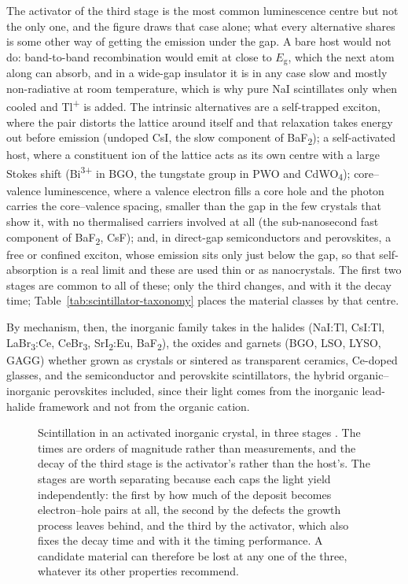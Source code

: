 The activator of the third stage is the most common luminescence centre but not the only one, and the figure draws that case alone; what every alternative shares is some other way of getting the emission under the gap.
A bare host would not do: band-to-band recombination would emit at close to $E_\mathrm{g}$, which the next atom along can absorb, and in a wide-gap insulator it is in any case slow and mostly non-radiative at room temperature, which is why pure NaI scintillates only when cooled and Tl\textsuperscript{+} is added.
The intrinsic alternatives are a self-trapped exciton, where the pair distorts the lattice around itself and that relaxation takes energy out before emission (undoped CsI, the slow component of BaF\textsubscript{2}); a self-activated host, where a constituent ion of the lattice acts as its own centre with a large Stokes shift (Bi\textsuperscript{3+} in BGO, the tungstate group in PWO and CdWO\textsubscript{4}); core--valence luminescence, where a valence electron fills a core hole and the photon carries the core--valence spacing, smaller than the gap in the few crystals that show it, with no thermalised carriers involved at all (the sub-nanosecond fast component of BaF\textsubscript{2}, CsF); and, in direct-gap semiconductors and perovskites, a free or confined exciton, whose emission sits only just below the gap, so that self-absorption is a real limit and these are used thin or as nanocrystals.
The first two stages are common to all of these; only the third changes, and with it the decay time; Table~\ref{tab:scintillator-taxonomy} places the material classes by that centre.

By mechanism, then, the inorganic family takes in the halides (NaI:Tl, CsI:Tl, LaBr\textsubscript{3}:Ce, CeBr\textsubscript{3}, SrI\textsubscript{2}:Eu, BaF\textsubscript{2}), the oxides and garnets (BGO, LSO, LYSO, GAGG) whether grown as crystals or sintered as transparent ceramics, Ce-doped glasses, and the semiconductor and perovskite scintillators, the hybrid organic--inorganic perovskites included, since their light comes from the inorganic lead-halide framework and not from the organic cation.

\begin{figure}[tbp]
	\centering
	
	\caption[The three stages of inorganic scintillation]{%
		Scintillation in an activated inorganic crystal, in three stages \cite{Rodnyi1997}.
		The times are orders of magnitude rather than measurements, and the decay of the third stage is the activator's rather than the host's.
		The stages are worth separating because each caps the light yield independently: the first by how much of the deposit becomes electron--hole pairs at all, the second by the defects the growth process leaves behind, and the third by the activator, which also fixes the decay time and with it the timing performance.
		A candidate material can therefore be lost at any one of the three, whatever its other properties recommend.}
	\label{fig:scintillation-process}
\end{figure}

